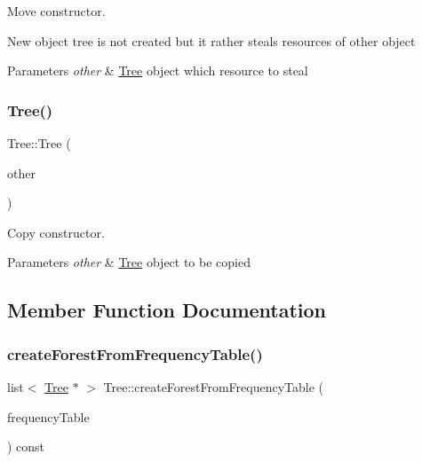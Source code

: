 Move constructor. 

New object tree is not created but it rather steals resources of other object 
\begin{DoxyParams}{Parameters}
{\em other} & \mbox{\hyperlink{class_tree}{Tree}} object which resource to steal \\
\hline
\end{DoxyParams}
\mbox{\label{class_tree_a8c22d028f94cbad27f3b96a336b2449c}} 
\subsubsection{\texorpdfstring{Tree()}{Tree()}\hspace{0.1cm}{\footnotesize\ttfamily [3/3]}}
{\footnotesize\ttfamily Tree\+::\+Tree (\begin{DoxyParamCaption}\item[{\mbox{\hyperlink{class_tree}{Tree}} const \&}]{other }\end{DoxyParamCaption})\hspace{0.3cm}{\ttfamily [inline]}}



Copy constructor. 


\begin{DoxyParams}{Parameters}
{\em other} & \mbox{\hyperlink{class_tree}{Tree}} object to be copied \\
\hline
\end{DoxyParams}


\subsection{Member Function Documentation}
\mbox{\label{class_tree_a64d7bc9c77c95100c84b708fac936820}} 
\subsubsection{\texorpdfstring{createForestFromFrequencyTable()}{createForestFromFrequencyTable()}}
{\footnotesize\ttfamily list$<$ \mbox{\hyperlink{class_tree}{Tree}} $\ast$ $>$ Tree\+::create\+Forest\+From\+Frequency\+Table (\begin{DoxyParamCaption}\item[{\mbox{\hyperlink{class_frequency_table}{Frequency\+Table}} \&}]{frequency\+Table }\end{DoxyParamCaption}) const}



